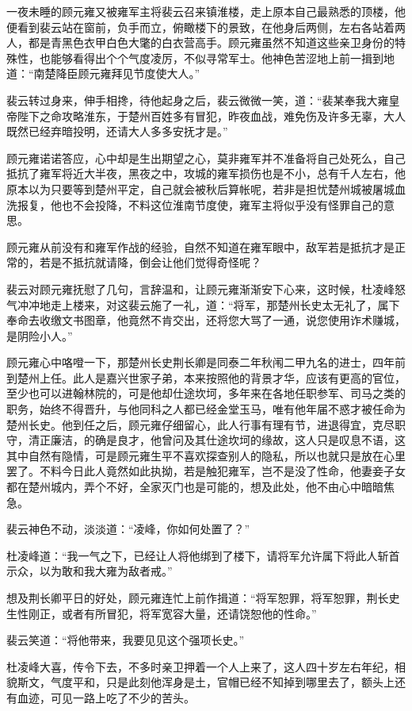 一夜未睡的顾元雍又被雍军主将裴云召来镇淮楼，走上原本自己最熟悉的顶楼，他便看到裴云站在窗前，负手而立，俯瞰楼下的景致，在他身后两侧，左右各站着两人，都是青黑色衣甲白色大氅的白衣营高手。顾元雍虽然不知道这些亲卫身份的特殊性，也能够看得出个个气度凌厉，不似寻常军士。他神色苦涩地上前一揖到地道：“南楚降臣顾元雍拜见节度使大人。”

裴云转过身来，伸手相搀，待他起身之后，裴云微微一笑，道：“裴某奉我大雍皇帝陛下之命攻略淮东，于楚州百姓多有冒犯，昨夜血战，难免伤及许多无辜，大人既然已经弃暗投明，还请大人多多安抚才是。”

顾元雍诺诺答应，心中却是生出期望之心，莫非雍军并不准备将自己处死么，自己抵抗了雍军将近大半夜，黑夜之中，攻城的雍军损伤也是不小，总有千人左右，他原本以为只要等到楚州平定，自己就会被秋后算帐呢，若非是担忧楚州城被屠城血洗报复，他也不会投降，不料这位淮南节度使，雍军主将似乎没有怪罪自己的意思。

顾元雍从前没有和雍军作战的经验，自然不知道在雍军眼中，敌军若是抵抗才是正常的，若是不抵抗就请降，倒会让他们觉得奇怪呢？

裴云对顾元雍抚慰了几句，言辞温和，让顾元雍渐渐安下心来，这时候，杜凌峰怒气冲冲地走上楼来，对这裴云施了一礼，道：“将军，那楚州长史太无礼了，属下奉命去收缴文书图章，他竟然不肯交出，还将您大骂了一通，说您使用诈术赚城，是阴险小人。”

顾元雍心中咯噔一下，那楚州长史荆长卿是同泰二年秋闱二甲九名的进士，四年前到楚州上任。此人是嘉兴世家子弟，本来按照他的背景才华，应该有更高的官位，至少也可以进翰林院的，可是他却仕途坎坷，多年来在各地任职参军、司马之类的职务，始终不得晋升，与他同科之人都已经金堂玉马，唯有他年届不惑才被任命为楚州长史。他到任之后，顾元雍仔细留心，此人行事有理有节，进退得宜，克尽职守，清正廉洁，的确是良才，他曾问及其仕途坎坷的缘故，这人只是叹息不语，这其中自然有隐情，可是顾元雍生平不喜欢探查别人的隐私，所以也就只是放在心里罢了。不料今日此人竟然如此执拗，若是触犯雍军，岂不是没了性命，他妻妾子女都在楚州城内，弄个不好，全家灭门也是可能的，想及此处，他不由心中暗暗焦急。

裴云神色不动，淡淡道：“凌峰，你如何处置了？”

杜凌峰道：“我一气之下，已经让人将他绑到了楼下，请将军允许属下将此人斩首示众，以为敢和我大雍为敌者戒。”

想及荆长卿平日的好处，顾元雍连忙上前作揖道：“将军恕罪，将军恕罪，荆长史生性刚正，或者有所冒犯，将军宽容大量，还请饶恕他的性命。”

裴云笑道：“将他带来，我要见见这个强项长史。”

杜凌峰大喜，传令下去，不多时亲卫押着一个人上来了，这人四十岁左右年纪，相貌斯文，气度平和，只是此刻他浑身是土，官帽已经不知掉到哪里去了，额头上还有血迹，可见一路上吃了不少的苦头。

